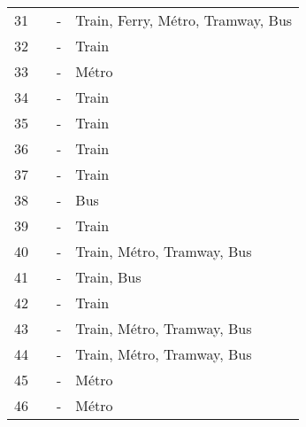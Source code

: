 \begin{longtable}{p{0.5cm}p{5.5cm}p{3cm}p{4cm}}
    \small{31} & \small{\textcite{flamm_perceptions_2014}}\index{Flamm, Bradley J.|pagebf} & \small{-} & \small{Train, Ferry, Métro, Tramway, Bus}\\
    \small{32} & \small{\textcite{fournier_continuous_2021}}\index{Fournier, Nicholas|pagebf} & \small{-} & \small{Train}\\
    \small{33} & \small{\textcite{gan_associations_2021}}\index{Gan, Zuoxian|pagebf} & \small{-} & \small{Métro}\\
    \small{34} & \small{\textcite{garcia-bello_methodological_2019}}\index{Marques, R.|pagebf} & \small{-} & \small{Train}\\
    \small{35} & \small{\textcite{geurs_multi-modal_2016}}\index{Geurs, Karst T.|pagebf} & \small{-} & \small{Train}\\
    \small{36} & \small{\textcite{giansoldati_train-feeder_2021}}\index{Giansoldati, Marco|pagebf} & \small{-} & \small{Train}\\
    \small{37} & \small{\textcite{givoni_access_2007}}\index{Givoni, Moshe|pagebf} & \small{-} & \small{Train}\\
    \small{38} & \small{\textcite{hagelin_return_2005}}\index{Hagelin, Christopher A.|pagebf} & \small{-} & \small{Bus}\\
    \small{39} & \small{\textcite{halldorsdottir_home-end_2017}}\index{Halldórsdóttir, Katrín|pagebf} & \small{-} & \small{Train}\\
    \small{40} & \small{\textcite{hamidi_shaping_2020}}\index{Hamidi, Zahra|pagebf} & \small{-} & \small{Train, Métro, Tramway, Bus}\\
    \small{41} & \small{\textcite{hamidi_inequalities_2019}}\index{Hamidi, Zahra|pagebf} & \small{-} & \small{Train, Bus}\\
    \small{42} & \small{\textcite{hasiak_access_2019}}\index{Hasiak, Sophie|pagebf} & \small{-} & \small{Train}\\
    \small{43} & \small{\textcite{heinen_multimodal_2014}}\index{Heinen, Eva|pagebf} & \small{-} & \small{Train, Métro, Tramway, Bus}\\
    \small{44} & \small{\textcite{hochmair_assessment_2015}}\index{Hochmair, Hartwig H.|pagebf} & \small{-} & \small{Train, Métro, Tramway, Bus}\\
    \small{45} & \small{\textcite{jansson_almeida_alternativas_2022}}\index{Jansson Almeida, Bárbara|pagebf} & \small{-} & \small{Métro}\\
    \small{46} & \small{\textcite{chen_demand_2013}}\index{Chen, Jingxu|pagebf} & \small{-} & \small{Métro}\\

\end{longtable}
